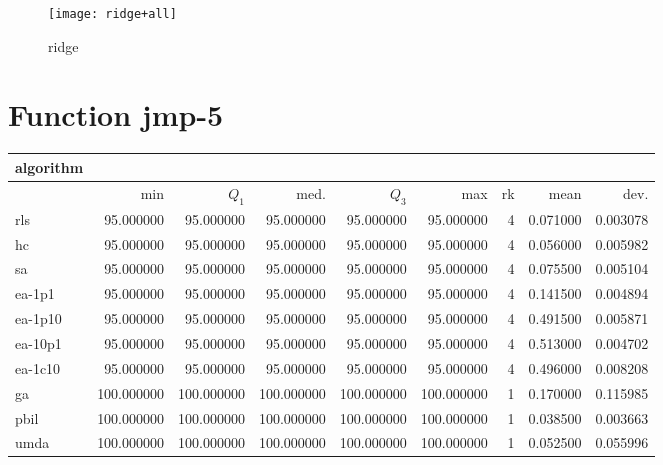 \begin{center}
\begin{figure}[h]
\centering
\texttt{[image: ridge+all]}
\caption{ridge}
\end{figure}
\end{center}

\newpage

\section{Function jmp-5}
\begin{center}
\begin{tabular}{@{}l*{5}{>{{}}N{3}{0}}>{{}}N{2}{0}N{1}{3}N{1}{3}@{}}
\toprule
{algorithm} &  &  \\
\midrule
& {min} & {$Q_1$} & {med.} & {$Q_3$} & {max} & {rk} & {mean} & {dev.} \\
\midrule
rls & 95.000000 & 95.000000 & 95.000000 & 95.000000 & 95.000000 & 4 & 0.071000 & 0.003078 \\
 hc & 95.000000 & 95.000000 & 95.000000 & 95.000000 & 95.000000 & 4 & 0.056000 & 0.005982 \\
 sa & 95.000000 & 95.000000 & 95.000000 & 95.000000 & 95.000000 & 4 & 0.075500 & 0.005104 \\
 ea-1p1 & 95.000000 & 95.000000 & 95.000000 & 95.000000 & 95.000000 & 4 & 0.141500 & 0.004894 \\
 ea-1p10 & 95.000000 & 95.000000 & 95.000000 & 95.000000 & 95.000000 & 4 & 0.491500 & 0.005871 \\
 ea-10p1 & 95.000000 & 95.000000 & 95.000000 & 95.000000 & 95.000000 & 4 & 0.513000 & 0.004702 \\
 ea-1c10 & 95.000000 & 95.000000 & 95.000000 & 95.000000 & 95.000000 & 4 & 0.496000 & 0.008208 \\
 ga & {\color{blue}} 100.000000 & {\color{blue}} 100.000000 & {\color{blue}} 100.000000 & {\color{blue}} 100.000000 & {\color{blue}} 100.000000 & 1 & 0.170000 & 0.115985 \\
 pbil & {\color{blue}} 100.000000 & {\color{blue}} 100.000000 & {\color{blue}} 100.000000 & {\color{blue}} 100.000000 & {\color{blue}} 100.000000 & 1 & 0.038500 & 0.003663 \\
 umda & {\color{blue}} 100.000000 & {\color{blue}} 100.000000 & {\color{blue}} 100.000000 & {\color{blue}} 100.000000 & {\color{blue}} 100.000000 & 1 & 0.052500 & 0.055996 \\
 \bottomrule
\end{tabular}
\end{center}

